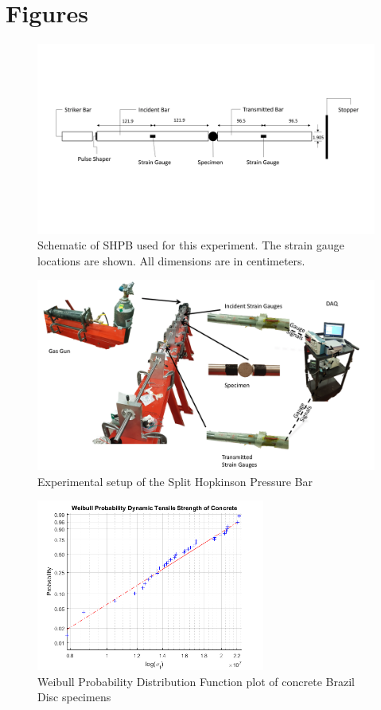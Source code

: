 \documentclass[12pt]{article}
\begin{document}
\section{Figures}
\begin{figure}[H]
	\centering
	\includegraphics[width=1\textwidth]{SHPB_diagram.png}
	\caption{Schematic of SHPB used for this experiment. The strain gauge locations are shown.  All dimensions are in centimeters.}
	\label{fig:Bars}
\end{figure}


\begin{figure}[H]
	\centering
	\includegraphics[width=1\textwidth]{TestSetUp.png}
	\caption{Experimental setup of the Split Hopkinson Pressure Bar}
	\label{fig:TestSetup}
\end{figure}

\begin{figure}[H]
	\centering
	\includegraphics[width=0.67\textwidth]{Weibull.png}
	\caption{Weibull Probability Distribution Function plot of concrete Brazil Disc specimens}
	\label{fig:Weibull}
\end{figure}
\end{document}
